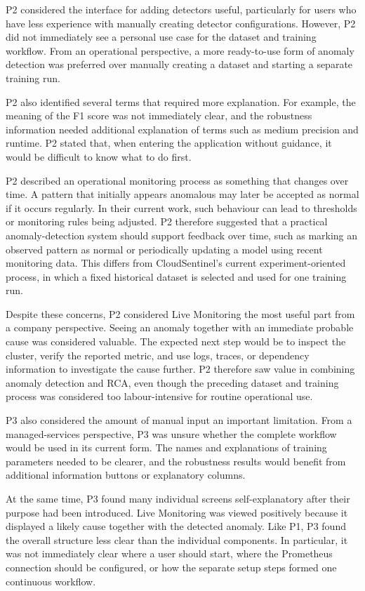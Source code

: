 P2 considered the interface for adding detectors useful, particularly for users who have less experience with manually creating detector configurations. However, P2 did not immediately see a personal use case for the dataset and training workflow. From an operational perspective, a more ready-to-use form of anomaly detection was preferred over manually creating a dataset and starting a separate training run.

P2 also identified several terms that required more explanation. For example, the meaning of the F1 score was not immediately clear, and the robustness information needed additional explanation of terms such as medium precision and runtime. P2 stated that, when entering the application without guidance, it would be difficult to know what to do first.

P2 described an operational monitoring process as something that changes over time. A pattern that initially appears anomalous may later be accepted as normal if it occurs regularly. In their current work, such behaviour can lead to thresholds or monitoring rules being adjusted. P2 therefore suggested that a practical anomaly-detection system should support feedback over time, such as marking an observed pattern as normal or periodically updating a model using recent monitoring data. This differs from CloudSentinel's current experiment-oriented process, in which a fixed historical dataset is selected and used for one training run.

Despite these concerns, P2 considered Live Monitoring the most useful part from a company perspective. Seeing an anomaly together with an immediate probable cause was considered valuable. The expected next step would be to inspect the cluster, verify the reported metric, and use logs, traces, or dependency information to investigate the cause further. P2 therefore saw value in combining anomaly detection and RCA, even though the preceding dataset and training process was considered too labour-intensive for routine operational use.

P3 also considered the amount of manual input an important limitation. From a managed-services perspective, P3 was unsure whether the complete workflow would be used in its current form. The names and explanations of training parameters needed to be clearer, and the robustness results would benefit from additional information buttons or explanatory columns.

At the same time, P3 found many individual screens self-explanatory after their purpose had been introduced. Live Monitoring was viewed positively because it displayed a likely cause together with the detected anomaly. Like P1, P3 found the overall structure less clear than the individual components. In particular, it was not immediately clear where a user should start, where the Prometheus connection should be configured, or how the separate setup steps formed one continuous workflow.


